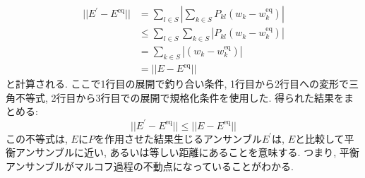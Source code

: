 \begin{align}
    || E^{\prime} - E^{\mathrm{eq}} ||
    &=
    \sum_{l \in S}
    \left| \sum_{k \in S} P_{kl} (w_{k} - w_{k}^{\mathrm{eq}}) \right| \\
    &\le
    \sum_{l \in S} \sum_{k \in S}
    \left| P_{kl} (w_{k} - w_{k}^{\mathrm{eq}}) \right| \\
    &=
    \sum_{k \in S} \left| (w_{k} - w_{k}^{\mathrm{eq}}) \right| \\
    &=
    || E - E^{\mathrm{eq}} ||
\end{align}
と計算される.
ここで1行目の展開で釣り合い条件, 1行目から2行目への変形で三角不等式, 2行目から3行目での展開で規格化条件を使用した.
得られた結果をまとめる:
\begin{equation}
    || E^{\prime} - E^{\mathrm{eq}} || \le || E - E^{\mathrm{eq}} ||
\end{equation}
この不等式は, $E$に$P$を作用させた結果生じるアンサンブル$E^{\prime}$は, $E$と比較して平衡アンサンブルに近い, あるいは等しい距離にあることを意味する.
つまり, 平衡アンサンブルがマルコフ過程の不動点になっていることがわかる.

